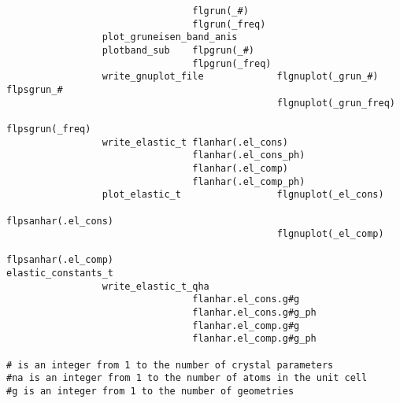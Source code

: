 \documentclass[12pt,a4paper,twoside]{report}
\begin{document}
\begin{footnotesize}
\begin{verbatim}
                                 flgrun(_#)
                                 flgrun(_freq)
                 plot_gruneisen_band_anis
                 plotband_sub    flpgrun(_#)
                                 flpgrun(_freq)
                 write_gnuplot_file             flgnuplot(_grun_#)   flpsgrun_#
                                                flgnuplot(_grun_freq) 
                                                                 flpsgrun(_freq)
                 write_elastic_t flanhar(.el_cons)
                                 flanhar(.el_cons_ph)
                                 flanhar(.el_comp)
                                 flanhar(.el_comp_ph)
                 plot_elastic_t                 flgnuplot(_el_cons)  
                                                           flpsanhar(.el_cons)
                                                flgnuplot(_el_comp)  
                                                           flpsanhar(.el_comp)
elastic_constants_t
                 write_elastic_t_qha
                                 flanhar.el_cons.g#g
                                 flanhar.el_cons.g#g_ph
                                 flanhar.el_comp.g#g
                                 flanhar.el_comp.g#g_ph

# is an integer from 1 to the number of crystal parameters
#na is an integer from 1 to the number of atoms in the unit cell
#g is an integer from 1 to the number of geometries
\end{verbatim} 
\end{footnotesize}
\end{document}
